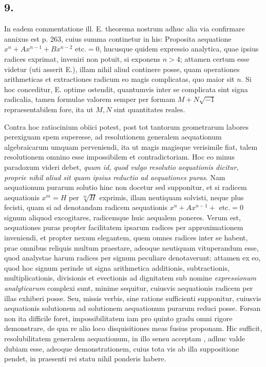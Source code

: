 \documentclass[twoside,12pt, showframe]{memoir}
\begin{document}
 
\subsection*{9.}

In eadem commentatione ill. \textsc{E.} theorema nostrum adhuc alia via confirmare annixus est p. 263, cuius summa continetur in his: Proposita aequatione \(x^n + Ax^{n-1} + B x^{n-2} \text{ etc{.}} = 0\), hucusque quidem expressio analytica, quae ipsius radices exprimat, inveniri non potuit, si exponens \(n>4\); attamen certum esse videtur (uti asserit \textsc{E.}), illam nihil aliud continere posse, quam operationes arithmeticas et extractiones radicum eo magis complicatas, quo maior sit \(n\). Si hoc conceditur, \textsc{E.} optime ostendit, quantumvis inter se complicata sint signa radicalia, tamen formulae valorem semper per formam \(M+N\surd{-1}\) repraesentabilem fore, ita ut \(M, N\) sint quantitates reales.

Contra hoc ratiocinium obiici potest, post tot tantorum geometrarum labores perexiguam spem superesse, ad resolutionem generalem aequationum algebraicarum umquam perveniendi, ita ut magis magisque verisimile fiat, talem resolutionem omnino esse impossibilem et contradictoriam. Hoc eo minus paradoxum videri debet, \textit{quum id, quod vulgo resolutio aequationis dicitur, proprie nihil aliud sit quam ipsius reductio ad aequationes puras}. Nam aequationum purarum solutio hinc non docetur sed supponitur, et si radicem aequationis \(x^m = H \) per \(\sqrt[m]{H}\) exprimis, illam neutiquam solvisti, neque plus fecisti, quam si ad denotandam radicem aequationis \(x^n + Ax^{n-1}+ \text{ etc{.}} = 0\) signum aliquod excogitares, radicemque huic aequalem poneres. Verum est, aequationes puras propter facilitatem ipsarum radices per approximationem inveniendi, et propter nexum elegantem, quem omnes radices inter se habent, prae omnibus reliquis multum praestare, adeoque neutiquam vituperandum esse, quod analystae harum radices per signum peculiare denotaverunt: attamen ex eo, quod hoc signum perinde ut signa arithmetica additionis, subtractionis, multiplicationis, divisionis et evectionis ad dignitatem sub nomine \textit{expressionum analyticarum} complexi sunt, minime sequitur, cuiusvis aequationis radicem per illas exhiberi posse. Seu, missis verbis, sine ratione sufficienti supponitur, cuiusvis aequationis solutionem ad solutionem aequationum purarum reduci posse. Forsan non ita difficile foret, impossibilitatem iam pro quinto gradu omni rigore demonstrare, de qua re alio loco disquisitiones meas fusius proponam. Hic sufficit, resolubilitatem generalem aequationum, in illo sensu acceptam , adhuc valde dubiam esse, adeoque demonstrationem, cuius tota vis ab illa suppositione pendet, in praesenti rei statu nihil ponderis habere.
\end{document}
